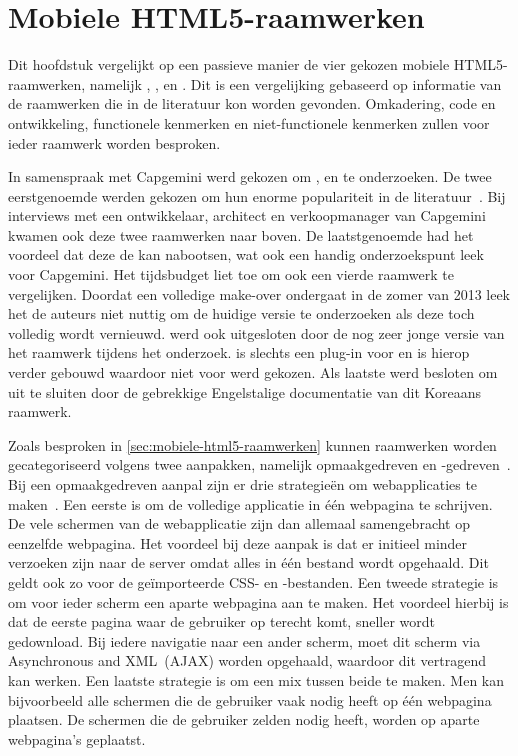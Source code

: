 \chapter{Mobiele HTML5-raamwerken}
\label{chap:raamwerken}

Dit hoofdstuk vergelijkt op een passieve manier de vier gekozen mobiele HTML5-raamwerken, namelijk \st{}, \kendo{}, \jqm{} en \lungo{}.
Dit is een vergelijking gebaseerd op informatie van de raamwerken die in de literatuur kon worden gevonden.
Omkadering, code en ontwikkeling, functionele kenmerken en niet-functionele kenmerken zullen voor ieder raamwerk worden besproken.

In samenspraak met Capgemini werd gekozen om \jqm{}, \st{} en \kendo{} te onderzoeken.
De twee eerstgenoemde werden gekozen om hun enorme populariteit in de literatuur~\cite{Firtman2013,Hales2012,Oeflman2011,David2011}.
Bij interviews met een ontwikkelaar, architect en verkoopmanager van Capgemini kwamen ook deze twee raamwerken naar boven.
De laatstgenoemde had het voordeel dat deze de  kan nabootsen, wat ook een handig onderzoekspunt leek voor Capgemini.
Het tijdsbudget liet toe om ook een vierde raamwerk te vergelijken.
Doordat \tmp{} een volledige make-over ondergaat in de zomer van 2013 leek het de auteurs niet nuttig om de huidige versie te onderzoeken als deze toch volledig wordt vernieuwd.
\moobile{} werd ook uitgesloten door de nog zeer jonge versie van het raamwerk tijdens het onderzoek.
\jqt{} is slechts een plug-in voor \jqm{} en \st{} is hierop verder gebouwd waardoor niet voor \jqt{} werd gekozen.
Als laatste werd besloten om \davinci{} uit te sluiten door de gebrekkige Engelstalige documentatie van dit Koreaans raamwerk.

Zoals besproken in \ref{sec:mobiele-html5-raamwerken} kunnen raamwerken worden gecategoriseerd volgens twee aanpakken, namelijk opmaakgedreven en \js{}-gedreven~\cite{Oeflman2011}. 
Bij een opmaakgedreven aanpal zijn er drie strategieën om webapplicaties te maken~\cite{Broulik2012}. 
Een eerste is om de volledige applicatie in één webpagina te schrijven. 
De vele schermen van de webapplicatie zijn dan allemaal samengebracht op eenzelfde webpagina. 
Het voordeel bij deze aanpak is dat er initieel minder verzoeken zijn naar de server omdat alles in één bestand wordt opgehaald. 
Dit geldt ook zo voor de geïmporteerde CSS- en \js{}-bestanden. 
Een tweede strategie is om voor ieder scherm een aparte webpagina aan te maken. 
Het voordeel hierbij is dat de eerste pagina waar de gebruiker op terecht komt, sneller wordt gedownload. 
Bij iedere navigatie naar een ander scherm, moet dit scherm via Asynchronous \js{} and XML~(AJAX) worden opgehaald, waardoor dit vertragend kan werken. 
Een laatste strategie is om een mix tussen beide te maken. 
Men kan bijvoorbeeld alle schermen die de gebruiker vaak nodig heeft op één webpagina plaatsen. 
De schermen die de gebruiker zelden nodig heeft, worden op aparte webpagina's geplaatst.   


